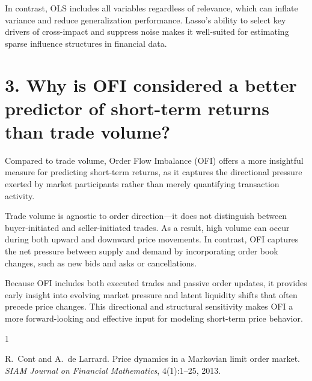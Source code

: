 \documentclass{article}
\begin{document}
In contrast, OLS includes all variables regardless of relevance, which can inflate variance and reduce generalization performance. Lasso’s ability to select key drivers of cross-impact and suppress noise makes it well-suited for estimating sparse influence structures in financial data.

\section*{3. Why is OFI considered a better predictor of short-term returns than trade volume?}

Compared to trade volume, Order Flow Imbalance (OFI) offers a more insightful measure for predicting short-term returns, as it captures the directional pressure exerted by market participants rather than merely quantifying transaction activity\cite{Cont2013}.

Trade volume is agnostic to order direction—it does not distinguish between buyer-initiated and seller-initiated trades. As a result, high volume can occur during both upward and downward price movements. In contrast, OFI captures the net pressure between supply and demand by incorporating order book changes, such as new bids and asks or cancellations.

Because OFI includes both executed trades and passive order updates, it provides early insight into evolving market pressure and latent liquidity shifts that often precede price changes. This directional and structural sensitivity makes OFI a more forward-looking and effective input for modeling short-term price behavior.


\begin{thebibliography}{1}

R.~Cont and A.~de Larrard.
\newblock Price dynamics in a Markovian limit order market.
\newblock \emph{SIAM Journal on Financial Mathematics}, 4(1):1--25, 2013.

\end{thebibliography}
\end{document}
